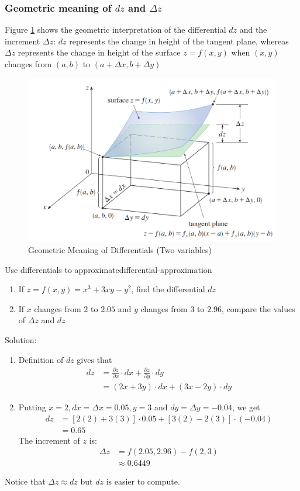 \documentclass[math,code]{amznotes}
\theoremstyle{remark}
\begin{document}
\subsubsection{Geometric meaning of $dz$ and $\Delta z$}
Figure \ref{fig:geomertic-meaning-of-differential-two-variables} shows the geometric interpretation of the differential $dz$ and the increment $\Delta z$: $dz$  represents the change in height of the tangent plane, whereas $\Delta z$ represents the change in height of the surface $z=f(x,y)$ when $(x,y)$ changes from $(a,b)$ to $(a+\Delta x, b+\Delta y)$
\begin{figure}[H]
    \centering
    \includegraphics[width=0.5\linewidth]{images/geomertic-meaning-of-differential-two-variables.png}
    \caption{Geometric Meaning of Differentials (Two variables)}
    \label{fig:geomertic-meaning-of-differential-two-variables}
\end{figure}
\begin{exbox}{Use differentials to approximate}{differential-approximation}
    \begin{enumerate}
        \item If $z=f(x,y)=x^3+3xy-y^2$, find the differential $dz$
        \item If $x$ changes from $2$ to $2.05$ and $y$ changes from $3$ to $2.96$, compare the values of $\Delta z$ and $dz$
    \end{enumerate}
    {\color{blue} Solution}:
    \begin{enumerate}
        \item Definition of $dz$ gives that
        \begin{align*}
            dz&=\frac{\partial z}{\partial x}\cdot dx+\frac{\partial z}{\partial y}\cdot dy \\
            &=(2x+3y)\cdot dx+(3x-2y)\cdot dy  
        \end{align*}
        \item Putting $x=2, dx=\Delta x=0.05, y=3$ and $dy=\Delta y=-0.04$, we get
        \begin{align*}
            dz&=[2(2)+3(3)]\cdot 0.05+[3(2)-2(3)]\cdot (-0.04) \\
            &=0.65
        \end{align*}
        The increment of $z$ is:
        \begin{align*}
            \Delta z &= f(2.05,2.96)-f(2,3) \\
            &\approx0.6449
        \end{align*}
    \end{enumerate}
    Notice that $\Delta z \approx dz$ but $dz$ is easier to compute.
\end{exbox}
\end{document}
